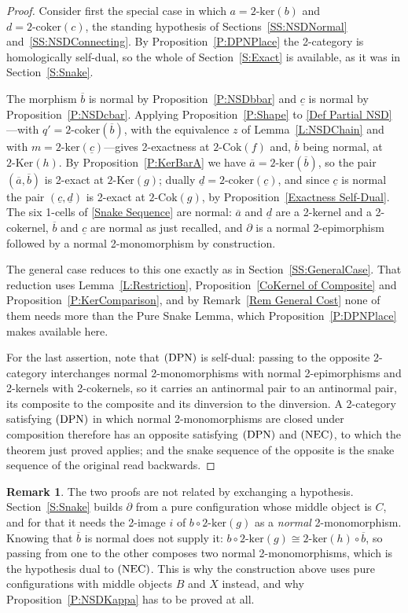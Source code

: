 \documentclass[reqno,a4paper]{amsart}
\numberwithin{equation}{section}
\theoremstyle{plain}
\theoremstyle{definition}
\newtheorem{remark}[subsection]{Remark}
\def\nameit#1{\textrm{#1}~}
\def\prox{\nameit{Proposition}}
\def\lemx{\nameit{Lemma}}
\def\remx{\nameit{Remark}}
\newcommand{\comp}{\circ}
\newcommand{\iso}{\cong}
\newcommand{\ov}[1]{\overline{#1}}
\renewcommand{\1}{\onecat{1}}
\newcommand{\DPN}{\textup{(DPN)}}
\newcommand{\NEC}{\textup{(NEC)}}
\newcommand{\TwoKer}{\ensuremath{2\text{-}\mathrm{Ker}}}
\newcommand{\TwoCoker}{\ensuremath{2\text{-}\mathrm{Cok}}}
\newcommand{\twoker}{\ensuremath{2\text{-}\mathrm{ker}}}
\newcommand{\twocoker}{\ensuremath{2\text{-}\mathrm{coker}}}
\begin{document}
\begin{proof}
	Consider first the special case in which \(a=\twoker(b)\) and \(d=\twocoker(c)\), the standing hypothesis of Sections~\ref{SS:NSDNormal} and~\ref{SS:NSDConnecting}. By \prox\ref{P:DPNPlace} the 2-category is homologically self-dual, so the whole of Section~\ref{S:Exact} is available, as it was in Section~\ref{S:Snake}.

	The morphism \(\ov{b}\) is normal by \prox\ref{P:NSDbbar} and \(\underline{c}\) is normal by \prox\ref{P:NSDcbar}. Applying \prox\ref{P:Shape} to \eqref{Def Partial NSD}---with \(q'=\twocoker(\ov{b})\), with the equivalence \(z\) of \lemx\ref{L:NSDChain} and with \(m=\twoker(\underline{c})\)---gives 2-exactness at \(\TwoCoker(f)\) and, \(\ov{b}\) being normal, at \(\TwoKer(h)\). By \prox\ref{P:KerBarA} we have \(\ov{a}=\twoker(\ov{b})\), so the pair \((\ov{a},\ov{b})\) is 2-exact at \(\TwoKer(g)\); dually \(\underline{d}=\twocoker(\underline{c})\), and since \(\underline{c}\) is normal the pair \((\underline{c},\underline{d})\) is 2-exact at \(\TwoCoker(g)\), by \prox\ref{Exactness Self-Dual}. The six 1-cells of \eqref{Snake Sequence} are normal: \(\ov{a}\) and \(\underline{d}\) are a 2-kernel and a 2-cokernel, \(\ov{b}\) and \(\underline{c}\) are normal as just recalled, and \(\partial\) is a normal 2-epimorphism followed by a normal 2-monomorphism by construction.

	The general case reduces to this one exactly as in Section~\ref{SS:GeneralCase}. That reduction uses \lemx\ref{L:Restriction}, \prox\ref{CoKernel of Composite} and \prox\ref{P:KerComparison}, and by \remx\ref{Rem General Cost} none of them needs more than the Pure Snake Lemma, which \prox\ref{P:DPNPlace} makes available here.

	For the last assertion, note that \(\DPN\) is self-dual: passing to the opposite 2-category interchanges normal 2-monomorphisms with normal 2-epimorphisms and 2-kernels with 2-cokernels, so it carries an antinormal pair to an antinormal pair, its composite to the composite and its dinversion to the dinversion. A 2-category satisfying \(\DPN\) in which normal 2-monomorphisms are closed under composition therefore has an opposite satisfying \(\DPN\) and \(\NEC\), to which the theorem just proved applies; and the snake sequence of the opposite is the snake sequence of the original read backwards.
\end{proof}

\begin{remark}\label{Rem NSD NotSwap}
	The two proofs are not related by exchanging a hypothesis. Section~\ref{S:Snake} builds \(\partial\) from a pure configuration whose middle object is \(C\), and for that it needs the 2-image \(i\) of \(b\comp\twoker(g)\) as a \emph{normal} 2-monomorphism. Knowing that \(\ov{b}\) is normal does not supply it: \(b\comp\twoker(g)\iso\twoker(h)\comp\ov{b}\), so passing from one to the other composes two normal 2-monomorphisms, which is the hypothesis dual to \(\NEC\). This is why the construction above uses pure configurations with middle objects \(B\) and \(X\) instead, and why \prox\ref{P:NSDKappa} has to be proved at all.
\end{remark}
\end{document}
